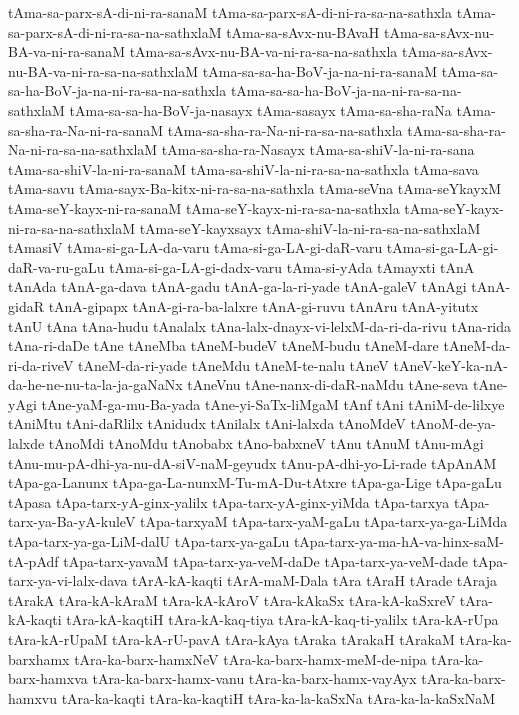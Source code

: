 {tAma-sa-parx-sA-di-ni-ra-sanaM
tAma-sa-parx-sA-di-ni-ra-sa-na-sathxla
tAma-sa-parx-sA-di-ni-ra-sa-na-sathxlaM
tAma-sa-sAvx-nu-BAvaH
tAma-sa-sAvx-nu-BA-va-ni-ra-sanaM
tAma-sa-sAvx-nu-BA-va-ni-ra-sa-na-sathxla
tAma-sa-sAvx-nu-BA-va-ni-ra-sa-na-sathxlaM
tAma-sa-sa-ha-BoV-ja-na-ni-ra-sanaM
tAma-sa-sa-ha-BoV-ja-na-ni-ra-sa-na-sathxla
tAma-sa-sa-ha-BoV-ja-na-ni-ra-sa-na-sathxlaM
tAma-sa-sa-ha-BoV-ja-nasayx
tAma-sasayx
tAma-sa-sha-raNa
tAma-sa-sha-ra-Na-ni-ra-sanaM
tAma-sa-sha-ra-Na-ni-ra-sa-na-sathxla
tAma-sa-sha-ra-Na-ni-ra-sa-na-sathxlaM
tAma-sa-sha-ra-Nasayx
tAma-sa-shiV-la-ni-ra-sana
tAma-sa-shiV-la-ni-ra-sanaM
tAma-sa-shiV-la-ni-ra-sa-na-sathxla
tAma-sava
tAma-savu
tAma-sayx-Ba-kitx-ni-ra-sa-na-sathxla
tAma-seVna
tAma-seYkayxM
tAma-seY-kayx-ni-ra-sanaM
tAma-seY-kayx-ni-ra-sa-na-sathxla
tAma-seY-kayx-ni-ra-sa-na-sathxlaM
tAma-seY-kayxsayx
tAma-shiV-la-ni-ra-sa-na-sathxlaM
tAmasiV
tAma-si-ga-LA-da-varu
tAma-si-ga-LA-gi-daR-varu
tAma-si-ga-LA-gi-daR-va-ru-gaLu
tAma-si-ga-LA-gi-dadx-varu
tAma-si-yAda
tAmayxti
tAnA
tAnAda
tAnA-ga-dava
tAnA-gadu
tAnA-ga-la-ri-yade
tAnA-galeV
tAnAgi
tAnA-gidaR
tAnA-gipapx
tAnA-gi-ra-ba-lalxre
tAnA-gi-ruvu
tAnAru
tAnA-yitutx
tAnU
tAna
tAna-hudu
tAnalalx
tAna-lalx-dnayx-vi-lelxM-da-ri-da-rivu
tAna-rida
tAna-ri-daDe
tAne
tAneMba
tAneM-budeV
tAneM-budu
tAneM-dare
tAneM-da-ri-da-riveV
tAneM-da-ri-yade
tAneMdu
tAneM-te-nalu
tAneV
tAneV-keY-ka-nA-da-he-ne-nu-ta-la-ja-gaNaNx
tAneVnu
tAne-nanx-di-daR-naMdu
tAne-seva
tAne-yAgi
tAne-yaM-ga-mu-Ba-yada
tAne-yi-SaTx-liMgaM
tAnf
tAni
tAniM-de-lilxye
tAniMtu
tAni-daRlilx
tAnidudx
tAnilalx
tAni-lalxda
tAnoMdeV
tAnoM-de-ya-lalxde
tAnoMdi
tAnoMdu
tAnobabx
tAno-babxneV
tAnu
tAnuM
tAnu-mAgi
tAnu-mu-pA-dhi-ya-nu-dA-siV-naM-geyudx
tAnu-pA-dhi-yo-Li-rade
tApAnAM
tApa-ga-Lanunx
tApa-ga-La-nunxM-Tu-mA-Du-tAtxre
tApa-ga-Lige
tApa-gaLu
tApasa
tApa-tarx-yA-ginx-yalilx
tApa-tarx-yA-ginx-yiMda
tApa-tarxya
tApa-tarx-ya-Ba-yA-kuleV
tApa-tarxyaM
tApa-tarx-yaM-gaLu
tApa-tarx-ya-ga-LiMda
tApa-tarx-ya-ga-LiM-dalU
tApa-tarx-ya-gaLu
tApa-tarx-ya-ma-hA-va-hinx-saM-tA-pAdf
tApa-tarx-yavaM
tApa-tarx-ya-veM-daDe
tApa-tarx-ya-veM-dade
tApa-tarx-ya-vi-lalx-dava
tArA-kA-kaqti
tArA-maM-Dala
tAra
tAraH
tArade
tAraja
tArakA
tAra-kA-kAraM
tAra-kA-kAroV
tAra-kAkaSx
tAra-kA-kaSxreV
tAra-kA-kaqti
tAra-kA-kaqtiH
tAra-kA-kaq-tiya
tAra-kA-kaq-ti-yalilx
tAra-kA-rUpa
tAra-kA-rUpaM
tAra-kA-rU-pavA
tAra-kAya
tAraka
tArakaH
tArakaM
tAra-ka-barxhamx
tAra-ka-barx-hamxNeV
tAra-ka-barx-hamx-meM-de-nipa
tAra-ka-barx-hamxva
tAra-ka-barx-hamx-vanu
tAra-ka-barx-hamx-vayAyx
tAra-ka-barx-hamxvu
tAra-ka-kaqti
tAra-ka-kaqtiH
tAra-ka-la-kaSxNa
tAra-ka-la-kaSxNaM
}
